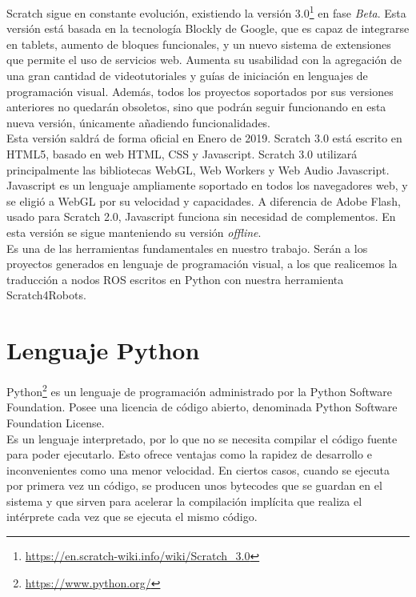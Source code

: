 Scratch sigue en constante evolución, existiendo la versión 3.0\footnote{\url{https://en.scratch-wiki.info/wiki/Scratch_3.0}} en fase \textit{Beta}. Esta versión está basada en la tecnología Blockly de Google, que es capaz de integrarse en tablets, aumento de bloques funcionales, y un nuevo sistema de extensiones que permite el uso de servicios web. Aumenta su usabilidad con la agregación de una gran cantidad de videotutoriales y guías de iniciación en lenguajes de programación visual. Además, todos los proyectos soportados por sus versiones anteriores no quedarán obsoletos, sino que podrán seguir funcionando en esta nueva versión, únicamente añadiendo funcionalidades.\\

Esta versión saldrá de forma oficial en Enero de 2019. Scratch 3.0 está escrito en HTML5, basado en web HTML, CSS y Javascript. Scratch 3.0 utilizará principalmente las bibliotecas WebGL, Web Workers y Web Audio Javascript. Javascript es un lenguaje ampliamente soportado en todos los navegadores web, y se eligió a WebGL por su velocidad y capacidades. A diferencia de Adobe Flash, usado para Scratch 2.0, Javascript funciona sin necesidad de complementos. En esta versión se sigue manteniendo su versión \textit{offline}.\\

Es una de las herramientas fundamentales en nuestro trabajo. Serán a los proyectos generados en lenguaje de programación visual, a los que realicemos la traducción a nodos ROS escritos en Python con nuestra herramienta Scratch4Robots.

\section{Lenguaje Python}
\label{sec:python}
 
Python\footnote{\url{https://www.python.org/}} es un lenguaje de programación administrado por la Python Software Foundation. Posee una licencia de código abierto, denominada Python Software Foundation License.\\

Es un lenguaje interpretado, por lo que no se necesita compilar el código fuente para poder ejecutarlo. Esto ofrece ventajas como la rapidez de desarrollo e inconvenientes como una menor velocidad. En ciertos casos, cuando se ejecuta por primera vez un código, se producen unos bytecodes que se guardan en el sistema y que sirven para acelerar la compilación implícita que realiza el intérprete cada vez que se ejecuta el mismo código. \\

